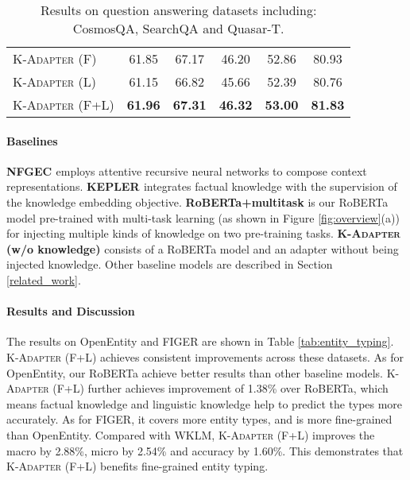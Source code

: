 \documentclass[11pt,a4paper]{article}
\begin{document}
\begin{table*}[!t]
\begin{center}
\begin{small}
\begin{tabular}{@{}l|cc|cc|c@{}}
\textsc{K-Adapter} (F)                        & 61.85          & 67.17          & 46.20 & 52.86 & 80.93             \\
\textsc{K-Adapter} (L)                         & 61.15          & 66.82          & 45.66          & 52.39          & 80.76             \\
\textsc{K-Adapter} (F+L)                               & \textbf{61.96} & \textbf{67.31} & \textbf{46.32}          & \textbf{53.00}          & \textbf{81.83}    \\ \bottomrule
\end{tabular}

\caption{Results on question answering datasets including: CosmosQA, SearchQA and Quasar-T.}
\label{tab:open-domain-qa}
\vspace{-2mm}
\end{small}
\end{center}
\end{table*}

\paragraph{Baselines}
\label{exper:entity_typing}
\textbf{NFGEC \citep{shimaoka2016attentive}} employs attentive recursive neural networks to compose context representations. \textbf{KEPLER \citep{wang2019kepler}} integrates factual knowledge with the supervision of the knowledge embedding objective. \textbf{RoBERTa+multitask} is our RoBERTa model pre-trained with multi-task learning (as shown in Figure \ref{fig:overview}(a)) for injecting multiple kinds of knowledge on two pre-training tasks. \textbf{\textsc{K-Adapter} (w/o knowledge)} consists of a RoBERTa model and an adapter without being injected knowledge.
Other baseline models are described in Section \ref{related_work}.


\paragraph{Results and Discussion} 
The results on OpenEntity and FIGER are shown in Table \ref{tab:entity_typing}. 
 \textsc{K-Adapter} (F+L) achieves consistent improvements across these datasets. 
As for OpenEntity, our RoBERTa achieve better results than other baseline models. \textsc{K-Adapter} (F+L) further achieves improvement of 1.38\%  over RoBERTa, which means factual knowledge and linguistic knowledge help to predict the types more accurately.
As for FIGER, it covers more entity types, and is more fine-grained than OpenEntity. Compared with WKLM, \textsc{K-Adapter} (F+L) improves the macro  by 2.88\%, micro  by 2.54\% and accuracy by 1.60\%. This demonstrates that \textsc{K-Adapter} (F+L) benefits fine-grained entity typing.
\end{document}
